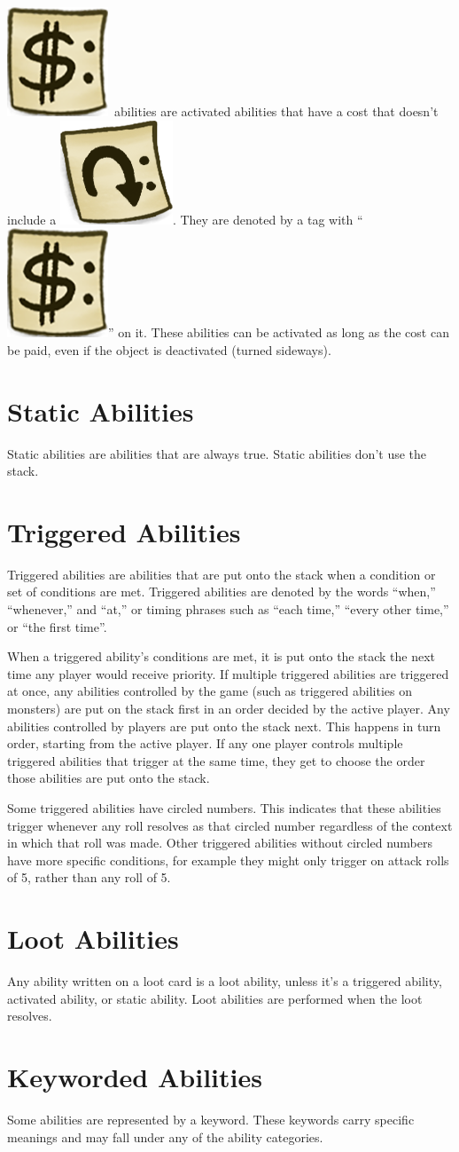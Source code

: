 \documentclass[a4paper, twoside]{report} %
\newcommand{\tap}{\includegraphics[scale=0.1]{./assets/Tag_Tap.png}}
\newcommand{\pay}{\includegraphics[scale=0.1]{./assets/Tag_Paid.png}}
\begin{document}
    \pay\ abilities are activated abilities that have a cost that doesn’t include a \tap. They are denoted by a tag with “\pay” on it. These abilities can be activated as long as the cost can be paid, even if the object is deactivated (turned sideways).

    \section{Static Abilities}
    Static abilities are abilities that are always true. Static abilities don’t use the stack.

    \section{Triggered Abilities}
    Triggered abilities are abilities that are put onto the stack when a condition or set of conditions are met. Triggered abilities are denoted by the words “when,” “whenever,” and “at,” or timing phrases such as “each time,” “every other time,” or “the first time”.

    When a triggered ability’s conditions are met, it is put onto the stack the next time any player would receive priority. If multiple triggered abilities are triggered at once, any abilities controlled by the game (such as triggered abilities on monsters) are put on the stack first in an order decided by the active player. Any abilities controlled by players are put onto the stack next. This happens in turn order, starting from the active player. If any one player controls multiple triggered abilities that trigger at the same time, they get to choose the order those abilities are put onto the stack.

    Some triggered abilities have circled numbers. This indicates that these abilities trigger whenever any roll resolves as that circled number regardless of the context in which that roll was made. Other triggered abilities without circled numbers have more specific conditions, for example they might only trigger on attack rolls of 5, rather than any roll of 5.

    \section{Loot Abilities}
    Any ability written on a loot card is a loot ability, unless it’s a triggered ability, activated ability, or static ability. Loot abilities are performed when the loot resolves.

    \section{Keyworded Abilities}
    \label{keyworded}
    Some abilities are represented by a keyword. These keywords carry specific meanings and may fall under any of the ability categories.
\end{document}
